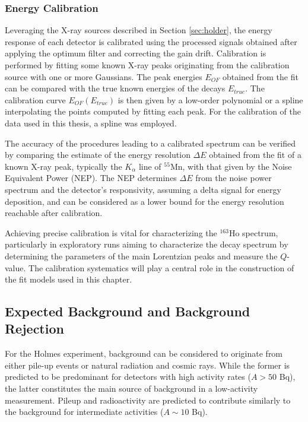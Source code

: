 \subsubsection*{Energy Calibration}
Leveraging the X-ray sources described in Section \ref{sec:holder}, the energy response of each detector is
calibrated using the processed signals obtained after applying the optimum filter and correcting the gain drift.
Calibration is performed by fitting some known X-ray peaks originating from the calibration source with one or more Gaussians. The peak energies $E_{OF}$ obtained
from the fit can be compared with the true known energies of the decays $E_{true}$. The calibration curve $E_{OF}
(E_{true})$ is then given by a low-order polynomial or a spline interpolating the points computed by fitting each peak. For the calibration of the data used in this thesis, a spline was employed.

The accuracy of the procedures leading to a calibrated spectrum can be verified by comparing the estimate of the energy
resolution $\Delta E$ obtained from the fit of a known X-ray peak, typically the $K_\alpha$ line of $^{55}$Mn, with that
given by the Noise Equivalent Power (NEP). The NEP determines $\Delta E$ from the noise power spectrum and the
detector's responsivity, assuming a delta signal for energy deposition, and can be considered as a lower bound for the
energy resolution reachable after calibration.

Achieving precise calibration is vital for characterizing the $^{163}$Ho spectrum, particularly in exploratory runs
aiming to characterize the decay spectrum by determining the parameters of the main Lorentzian peaks and measure the
$Q$-value. The calibration systematics will play a central role in the construction of the fit models used in this chapter.

\subsection{Expected Background and Background Rejection}\label{sec:expected}
For the Holmes experiment, background can be considered to originate from either pile-up events or natural radiation and
cosmic rays. While the former is predicted to be predominant for detectors with high activity rates ($A > 50$ Bq), the
latter constitutes the main source of background in a low-activity measurement. Pileup and radioactivity are predicted to
contribute similarly to the background for intermediate activities ($A \sim 10$ Bq).


